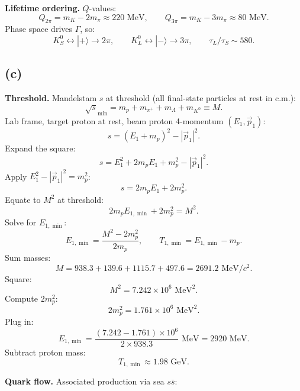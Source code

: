 \documentclass[11pt]{article}
\newcommand{\Kz}{K^{0}}
\begin{document}
\textbf{Lifetime ordering.} $Q$-values:
\[ Q_{2\pi} = m_K - 2 m_\pi \approx 220\text{ MeV},\qquad Q_{3\pi} = m_K - 3 m_\pi \approx 80\text{ MeV}. \]
Phase space drives $\Gamma$, so:
\[ \boxed{\;K^0_S \leftrightarrow |+\rangle\to 2\pi,\qquad K^0_L\leftrightarrow|-\rangle\to 3\pi,\qquad \tau_L/\tau_S\sim 580.\;} \]

\subsection*{(c)}

\textbf{Threshold.} Mandelstam $s$ at threshold (all final-state particles at rest in c.m.):
\[ \sqrt{s}_{\min} = m_p + m_{\pi^+} + m_\Lambda + m_{\Kz} \equiv M. \]
Lab frame, target proton at rest, beam proton 4-momentum $(E_1,\vec p_1)$:
\[ s = (E_1 + m_p)^2 - |\vec p_1|^2. \]
Expand the square:
\[ s = E_1^2 + 2 m_p E_1 + m_p^2 - |\vec p_1|^2. \]
Apply $E_1^2 - |\vec p_1|^2 = m_p^2$:
\[ s = 2 m_p E_1 + 2 m_p^2. \]
Equate to $M^2$ at threshold:
\[ 2 m_p E_{1,\min} + 2 m_p^2 = M^2. \]
Solve for $E_{1,\min}$:
\[ \boxed{\;E_{1,\min} = \frac{M^2 - 2 m_p^2}{2 m_p},\qquad T_{1,\min} = E_{1,\min} - m_p.\;} \]
Sum masses:
\[ M = 938.3 + 139.6 + 1115.7 + 497.6 = 2691.2\text{ MeV}/c^2. \]
Square:
\[ M^2 = 7.242\times 10^{6}\text{ MeV}^2. \]
Compute $2m_p^2$:
\[ 2m_p^2 = 1.761\times 10^{6}\text{ MeV}^2. \]
Plug in:
\[ E_{1,\min} = \frac{(7.242 - 1.761)\times 10^6}{2\times 938.3}\text{ MeV} = 2920\text{ MeV}. \]
Subtract proton mass:
\[ T_{1,\min} \approx 1.98\text{ GeV}. \]

\textbf{Quark flow.} Associated production via sea $s\bar s$:
\end{document}

